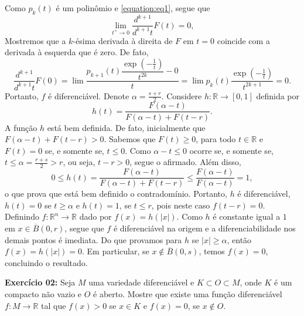 \documentclass[twoside,openright,titlepage,numbers=noenddot,headinclude,  lineheaders footinclude=true,cleardoublepage=empty,BCOR=5mm,paper=a4,fontsize=12pt ]{scrbook}
\begin{document}
Como $p _k (t)$ é um polinômio e \eqref{equation:eq1}, segue que
\[
    \lim _{t^+ \to 0} \frac{d^{k+1}}{d^{k+1} t} F (t) = 0,
\]
Mostremos que a $k$-ésima derivada à direita de $F$ em $t = 0$ coincide com a derivada à esquerda que é zero. 
De fato,
\[
    \frac{d^{k+1}}{d^{k+1} t} F (0) 
    = \lim  \dfrac{p _{k+1} (t) \dfrac{\exp\left(  -\frac{1}{t} \right)}{t^{2k} } - 0}{t} 
    =  \lim  p _{k} (t) \dfrac{\exp\left(  -\frac{1}{t} \right)}{t^{2k+1}}  = 0.
\]
Portanto, $f$ é diferenciável. 
Denote $\alpha  = \frac{s+r}{2}$. 
Considere $h: \mathbb{R} \rightarrow [0,1]$ definida por
\[
    h(t) =  \dfrac{F(\alpha -t)}{F(\alpha - t ) + F(t-r)}.
\]
A função $h$ está bem definida. 
De fato, inicialmente que $F(\alpha  -   t ) + F(t - r) >0$. Sabemos que $F(t)\geq 0$, para todo $t \in \mathbb{R}$ e $F(t)  = 0 $ se, e somente se, $t \leq 0$. 
Como $\alpha  - t \leq 0$ ocorre se, e somente se, $ t\leq  \alpha  = \frac{r+s}{2} > r$, ou seja, $ t-r > 0$, segue o afirmado. Além disso,
\[
    0 \leq h(t)   = \dfrac{F(\alpha -t)}{F(\alpha - t ) + F(t-r)} \leq  \dfrac{F(\alpha -t)}{F(\alpha - t ) } 
    = 1,
\]
o que prova que está bem definido o contradomínio. 
Portanto, $h$ é diferenciável, $h(t) = 0$ se $t \geq \alpha $ e $h (t) = 1$, se $t \leq r $, pois neste caso $ f(t-r) = 0$. 
Definindo $f: \mathbb{R}^n\rightarrow \mathbb{R}$ dado por $f(x) = h(|x|)$. 
Como $h$ é constante igual a $1$ em $x \in \overline{B}(0, r) $, segue que $f$ é diferenciável na origem e a diferenciabilidade nos demais pontos é imediata. 
Do que provamos para $h$ se $|x|\geq \alpha$, então $f(x) = h(|x|) = 0$. 
Em particular, se $x \notin \overline{B} (0, s)$, temos $f(x) =0$, concluindo o resultado. 



\vspace{2cm}

\textbf{Exercício 02:} 
Seja $M$ uma variedade diferenciável e $ K \subset O\subset M$, onde $K$ é um compacto não vazio e $O$ é aberto. 
Mostre que existe uma função diferenciável $f:M \rightarrow \mathbb{R}$ tal que $ f(x)>0$ se $x \in K$ e $f(x) = 0$, se $ x \notin O$.

\vspace{0.5cm}
\end{document}
